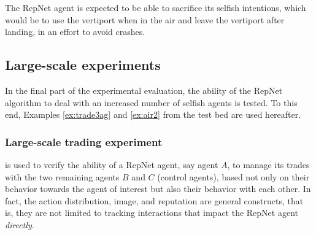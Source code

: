 
The RepNet agent is expected to be able to sacrifice its selfish intentions, which would be to use the vertiport when in the air and leave the vertiport after landing, in an effort to avoid crashes.


\subsection{Large-scale experiments}
\label{sub:largeexp}
In the final part of the experimental evaluation, the ability of the RepNet algorithm to deal with an increased number of selfish agents is tested. To this end, Examples \ref{ex:trade3ag} and \ref{ex:air2} from the test bed are used hereafter. 

\subsubsection{Large-scale trading experiment}
 is used to verify the ability of a RepNet agent, say agent $A$, to manage its trades with the two remaining agents $B$ and $C$ (control agents), based not only on their behavior towards the agent of interest but also their behavior with each other. In fact, the action distribution, image, and reputation are general constructs, that is, they are not limited to tracking interactions that impact the RepNet agent \textit{directly}. 


